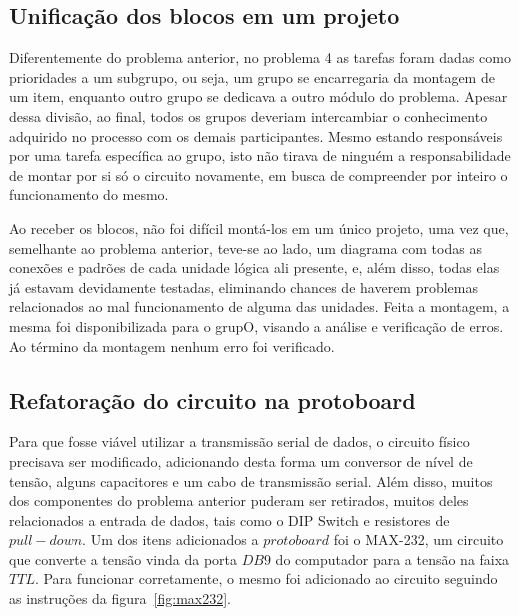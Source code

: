 \documentclass[12pt]{article}
\begin{document}
\subsection{Unificação dos blocos em um projeto}

Diferentemente do problema anterior, no problema 4 as tarefas foram dadas como prioridades a um subgrupo, ou seja, um grupo se encarregaria da montagem de um item, enquanto outro grupo se dedicava a outro módulo do problema. Apesar dessa divisão, ao final, todos os grupos deveriam intercambiar o conhecimento adquirido no processo com os demais participantes. Mesmo estando responsáveis por uma tarefa específica ao grupo, isto não tirava de ninguém a responsabilidade de montar por si só o circuito novamente, em busca de compreender por inteiro o funcionamento do mesmo.

Ao receber os blocos, não foi difícil montá-los em um único projeto, uma vez que, semelhante ao problema anterior, teve-se ao lado, um diagrama com todas as conexões e padrões de cada unidade lógica ali presente, e, além disso, todas elas já estavam devidamente testadas, eliminando chances de haverem problemas relacionados ao mal funcionamento de alguma das unidades. Feita a montagem, a mesma foi disponibilizada para o grupO, visando a análise e verificação de erros. Ao término da montagem nenhum erro foi verificado.

\subsection{Refatoração do circuito na protoboard}

Para que fosse viável utilizar a transmissão serial de dados, o circuito físico precisava ser modificado, adicionando desta forma um conversor de nível de tensão, alguns capacitores e um cabo de transmissão serial. Além disso, muitos dos componentes do problema anterior puderam ser retirados, muitos deles relacionados a entrada de dados, tais como o DIP Switch e resistores de $pull-down$. Um dos itens adicionados a $protoboard$ foi o MAX-232, um circuito que converte a tensão vinda da porta $DB9$ do computador para a tensão na faixa $TTL$. Para funcionar corretamente, o mesmo foi adicionado ao circuito seguindo as instruções da figura~\ref{fig:max232}.
\end{document}
